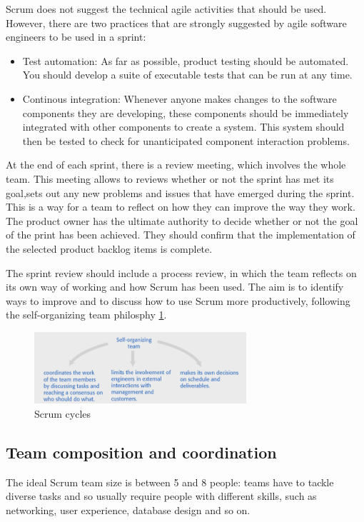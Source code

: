 \documentclass[10pt,a4paper]{report}
\begin{document}
Scrum does not suggest the technical agile activities that should be used. However, there are two practices that are strongly suggested by agile software engineers to be used in a sprint:
\begin{itemize}
	\item Test automation: As far as possible, product testing should be automated. You should develop a suite of executable tests that can be run at any time.
	
	\item Continous integration: Whenever anyone makes changes to the software components they are developing, these components should be immediately integrated with other components to create a system. This system should then be tested to check for unanticipated component interaction problems.
\end{itemize}

At the end of each sprint, there is a review meeting, which involves the
whole team. This meeting allows to reviews whether or not the sprint has met its goal,sets out any new problems and issues that have emerged during the sprint. This is a way for a team to reflect on how they can improve the way they work.
The product owner has the ultimate authority to decide whether or not the goal of the print has been achieved. They should confirm that the implementation of the selected product backlog items is complete.

The sprint review should include a process review, in which the team reflects on its own way of working and how Scrum has been used. The aim is to identify ways to improve and to discuss how to use Scrum more productively, following the self-organizing team philosphy \ref{image13}.
\begin{figure}[h]
	\centering
	\includegraphics[width=0.7\textwidth]{image13}
	\caption{Scrum cycles}
	\label{image13}
\end{figure}

\subsection{Team composition and coordination}
The ideal Scrum team size is between 5 and 8 people: teams have to tackle diverse tasks and so usually require people with different skills, such as networking, user experience, database design and so on.
\end{document}
